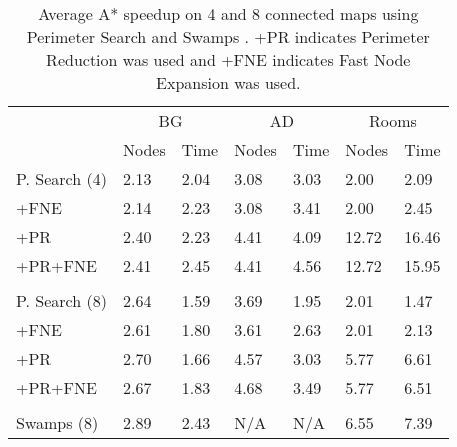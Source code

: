 \begin{table}[ht]
\caption{Average A* speedup on 4 and 8 connected maps using Perimeter Search
and Swamps \cite{pochter10}.
+PR indicates Perimeter Reduction was used and +FNE indicates Fast Node
Expansion was used.}


\begin{center}
\begin{tabular*}{\columnwidth}{p{1.8cm}m{0.62cm}m{0.62cm}m{0.62cm}m{0.62cm}m{0.62cm}m{0.62cm}}
  \hline
   & \multicolumn{2}{c}{BG} & \multicolumn{2}{c}{AD} & \multicolumn{2}{c}{Rooms}\\
	& Nodes & Time & Nodes & Time & Nodes & Time \\
  \hline

	P. Search (4) & 2.13 & 2.04 & 3.08 & 3.03 & 2.00 & 2.09 \\ 
	+FNE  & 2.14 & 2.23 & 3.08 & 3.41 & 2.00 & 2.45 \\ 
	+PR  & 2.40 & 2.23 & 4.41 & 4.09 & 12.72 & 16.46 \\ 
	+PR+FNE & 2.41 & 2.45 & 4.41 & 4.56 & 12.72 & 15.95 \\  \\ 
	P. Search (8) & 2.64 & 1.59 & 3.69 & 1.95 & 2.01 & 1.47 \\ 
	+FNE  & 2.61 & 1.80 & 3.61 & 2.63 & 2.01 & 2.13 \\ 
	+PR  & 2.70 & 1.66 & 4.57 & 3.03 & 5.77 & 6.61 \\ 
	+PR+FNE  & 2.67 & 1.83 & 4.68 & 3.49 & 5.77 & 6.51 \\  \\
	Swamps (8) & 2.89 & 2.43 & N/A & N/A & 6.55 & 7.39 \\ 
   \hline
\end{tabular*}
\end{center}
\end{table}
